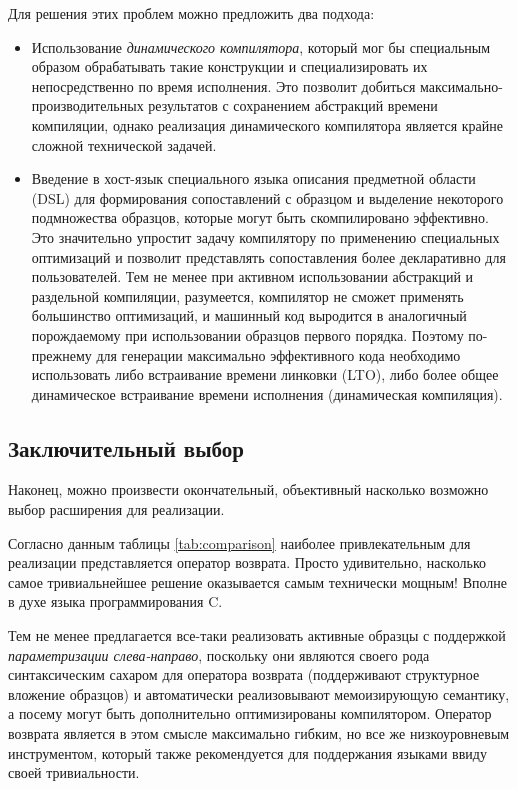 Для решения этих проблем можно предложить два подхода:
\begin{itemize}
\item Использование \textit{динамического компилятора}, который мог бы специальным образом обрабатывать такие конструкции и специализировать их непосредственно по время исполнения. Это позволит добиться максимально-производительных результатов с сохранением абстракций времени компиляции, однако реализация динамического компилятора является крайне сложной технической задачей.
\item Введение в хост-язык специального языка описания предметной области (DSL) для формирования сопоставлений с образцом и выделение некоторого подмножества образцов, которые могут быть скомпилировано эффективно. Это значительно упростит задачу компилятору по применению специальных оптимизаций и позволит представлять сопоставления более декларативно для пользователей. Тем не менее при активном использовании абстракций и раздельной компиляции, разумеется, компилятор не сможет применять большинство оптимизаций, и машинный код выродится в аналогичный порождаемому при использовании образцов первого порядка. Поэтому по-прежнему для генерации максимально эффективного кода необходимо использовать либо встраивание времени линковки (LTO), либо более общее динамическое встраивание времени исполнения (динамическая компиляция).
\end{itemize}

\subsection{Заключительный выбор} \label{sec:final_choice}

Наконец, можно произвести окончательный, объективный насколько возможно выбор расширения для реализации. 

Согласно данным таблицы \ref{tab:comparison} наиболее привлекательным для реализации представляется оператор возврата. Просто удивительно, насколько самое тривиальнейшее решение оказывается самым технически мощным! Вполне в духе языка программирования C.

Тем не менее предлагается все-таки реализовать активные образцы с поддержкой \textit{параметризации слева-направо}, поскольку они являются своего рода синтаксическим сахаром для оператора возврата (поддерживают структурное вложение образцов) и автоматически реализовывают мемоизирующую семантику, а посему могут быть дополнительно оптимизированы компилятором. Оператор возврата является в этом смысле максимально гибким, но все же низкоуровневым инструментом, который также рекомендуется для поддержания языками ввиду своей тривиальности.


